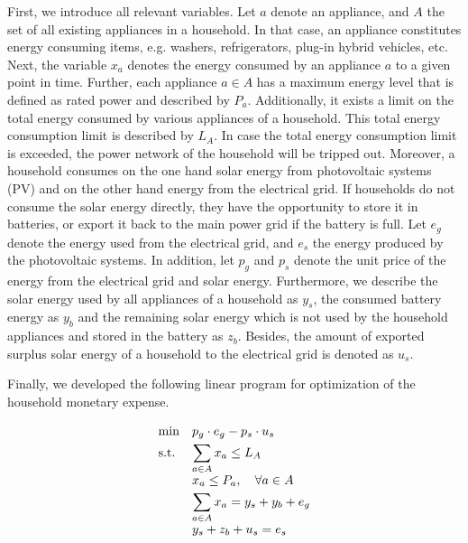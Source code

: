 First, we introduce all relevant variables. Let $a$ denote an appliance, and $A$ the set of all existing appliances in a household.
In that case, an appliance constitutes energy consuming items, e.g. washers, refrigerators, plug-in hybrid vehicles, etc.
Next, the variable $x_{a}$ denotes the energy consumed by an appliance $a$  to a given point in time. 
Further, each appliance $a \in A$ has a maximum energy level that is defined as rated power and described by $P_{a}$.
Additionally, it exists a limit on the total energy consumed by various appliances of a household. This total 
energy consumption limit is described by $L_{A}$. In case the total energy consumption limit is exceeded, the power network of 
the household will be tripped out.
Moreover, a household consumes on the one hand solar energy from
photovoltaic systems (PV) and on the other hand energy from the electrical grid. 
If households do not consume the solar energy directly, they have the opportunity to 
store it in batteries, or export it back to the main power grid if the battery is full.
Let $e_{g}$ denote the energy used from the electrical grid, and $e_{s}$ the energy produced by the photovoltaic systems.
In addition, let $p_{g}$ and $p_{s}$ denote the unit price of the energy from the electrical grid and solar energy.
Furthermore, we describe the solar energy used by all appliances of a household as $y_{s}$, the consumed battery energy 
as $y_{b}$ and the remaining solar energy which is not used by the household appliances and stored in the battery as $z_{b}$.
Besides, the amount of exported surplus solar energy of a household to the electrical grid is denoted as $u_{s}$.

Finally, we developed the following linear program for optimization of the household monetary expense.

\begin{equation}
    \begin{array}{ll@{}ll}
        \text{min}  & \displaystyle p_{g} \cdot e_{g} - p_{s} \cdot u_{s} &\\
        \text{s.t.}& \displaystyle \sum\limits_{a \in A}^{} x_{a} \leq L_{A}  \\
					& \displaystyle x_{a} \leq P_{a}, \quad \forall a \in A \\
					& \displaystyle \sum\limits_{a \in A}^{} x_{a} = y_{s} + y_{b} + e_{g} \\
					& \displaystyle y_{s} + z_{b} + u_{s} = e_{s}
    \end{array}
\end{equation}


